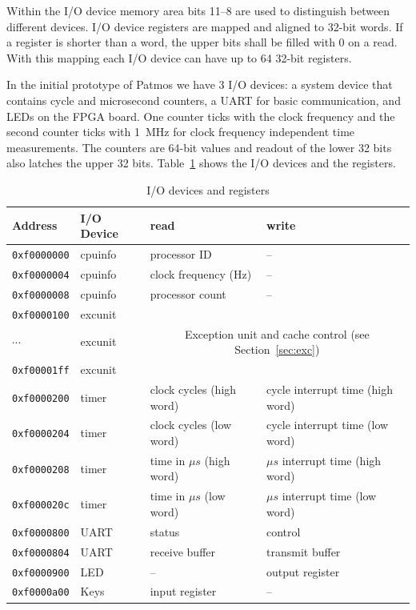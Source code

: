 \documentclass[a4paper,fontsize=10pt,twoside,DIV15,BCOR12mm,headinclude=true,footinclude=false,pagesize,bibtotoc]{scrbook}
\newcommand{\code}[1]{{\texttt{#1}}}
\begin{document}
Within the I/O device memory area bits 11--8 are used to distinguish between different devices.
I/O device registers are mapped and aligned to 32-bit words. If a register is shorter than a word,
the upper bits shall be filled with 0 on a read. With this mapping each I/O device can have up to
64 32-bit registers.

In the initial prototype of Patmos we have 3 I/O devices: a system device that contains cycle and microsecond counters, a UART for basic communication, and LEDs
on the FPGA board. One counter ticks with the clock frequency and the second
counter ticks with 1~MHz for clock frequency independent time measurements.
The counters are 64-bit values and readout of the lower 32 bits also latches the
upper 32 bits.
Table~\ref{tab:iomap} shows the I/O devices and the registers.

\begin{table}
\centering
\begin{tabular}{llll}
\toprule
Address & I/O Device & read & write \\
\midrule
\code{0xf0000000} & cpuinfo & processor ID & -- \\
\code{0xf0000004} & cpuinfo & clock frequency (Hz) & -- \\
\code{0xf0000008} & cpuinfo & processor count & -- \\
\code{0xf0000100} & excunit & &  \\
$\cdots$          & excunit & \multicolumn{2}{c}{Exception unit and cache control (see Section~\ref{sec:exc})} \\
\code{0xf00001ff} & excunit & & \\
\code{0xf0000200} & timer & clock cycles (high word) & cycle interrupt time (high word) \\
\code{0xf0000204} & timer & clock cycles (low word) & cycle interrupt time (low word) \\
\code{0xf0000208} & timer & time in $\mu s$ (high word) & $\mu s$ interrupt time (high word) \\
\code{0xf000020c} & timer & time in $\mu s$ (low word) &  $\mu s$ interrupt time (low word) \\
\code{0xf0000800} & UART & status & control \\
\code{0xf0000804} & UART & receive buffer & transmit buffer \\
\code{0xf0000900} & LED & -- & output register \\
\code{0xf0000a00} & Keys & input register & -- \\
\bottomrule
\end{tabular}
\caption{I/O devices and registers}
\label{tab:iomap}
\end{table}
\end{document}
